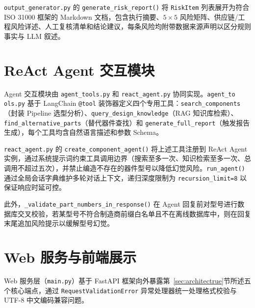 \texttt{output\_generator.py} 的 \texttt{generate\_risk\_report()} 将 \texttt{RiskItem} 列表展开为符合 ISO 31000 框架的 Markdown 文档，包含执行摘要、$5\times 5$ 风险矩阵、供应链/工程风险详述、人工复核清单和结论建议，每条风险均附带数据来源声明以区分规则事实与 LLM 叙述。

\section{ReAct Agent 交互模块}

Agent 交互模块由 \texttt{agent\_tools.py} 和 \texttt{react\_agent.py} 协同实现。\texttt{agent\_to\\ols.py} 基于 LangChain \texttt{@tool} 装饰器定义四个专用工具：\texttt{search\_components}（封装 Pipeline 选型分析）、\texttt{query\_design\_knowledge}（RAG 知识库检索）、\texttt{find\_alternative\_parts}（替代器件查找）和 \texttt{generate\_full\_report}（触发报告生成），每个工具均含自然语言描述和参数 Schema。

\texttt{react\_agent.py} 的 \texttt{create\_component\_agent()} 将上述工具注册到 ReAct Agent 实例，通过系统提示词约束工具调用边界（搜索至多一次、知识检索至多一次、总调用不超过五次），并禁止编造不存在的器件型号以降低幻觉风险。\texttt{run\_agent()} 通过全局会话字典维护多轮对话上下文，递归深度限制为 \texttt{recursion\_limit=8} 以保证响应时延可控。

此外，\texttt{\_validate\_part\_numbers\_in\_response()} 在 Agent 回复前对型号进行数据库交叉校验，若某型号不符合制造商前缀白名单且不在离线数据库中，则在回复末尾追加风险提示以缓解型号幻觉。

\section{Web 服务与前端展示}

Web 服务层（\texttt{main.py}）基于 FastAPI 框架向外暴露第~\ref{sec:architectrue}节所述五个核心端点，通过 \texttt{RequestValidationError} 异常处理器统一处理格式校验与 UTF-8 中文编码兼容问题。

